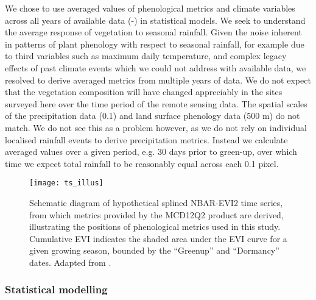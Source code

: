 \documentclass[11pt,a4paper]{article}
\begin{document}
We chose to use averaged values of phenological metrics and climate variables across all years of available data (\modisStart{}-\modisEnd{}) in statistical models. We seek to understand the average response of vegetation to seasonal rainfall. Given the noise inherent in patterns of plant phenology with respect to seasonal rainfall, for example due to third variables such as maximum daily temperature, and complex legacy effects of past climate events which we could not address with available data, we resolved to derive averaged metrics from multiple years of data. We do not expect that the vegetation composition will have changed appreciably in the sites surveyed here over the time period of the remote sensing data. The spatial scales of the precipitation data (0.1\textdegree{}) and land surface phenology data (500 m) do not match. We do not see this as a problem however, as we do not rely on individual localised rainfall events to derive precipitation metrics. Instead we calculate averaged values over a given period, e.g. 30 days prior to green-up, over which time we expect total rainfall to be reasonably equal across each 0.1\textdegree{} pixel. 

\begin{figure}[H]
\centering
	\texttt{[image: ts\_illus]}
	\caption{Schematic diagram of hypothetical splined NBAR-EVI2 time series, from which metrics provided by the MCD12Q2 product are derived, illustrating the positions of phenological metrics used in this study. Cumulative EVI indicates the shaded area under the EVI curve for a given growing season, bounded by the ``Greenup'' and ``Dormancy'' dates. Adapted from \citep{Gray2022}.}
	\label{ts_illus}
\end{figure}

\subsubsection{Statistical modelling}
\end{document}
